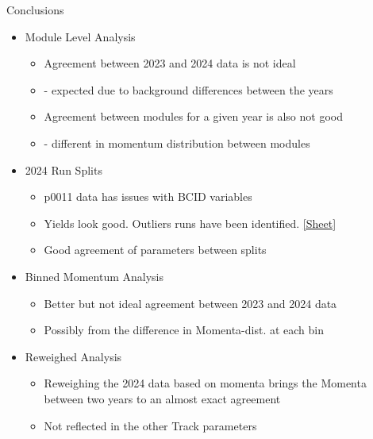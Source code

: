 \begin{frame}{Conclusions}
    \begin{itemize}
        \item Module Level Analysis
        \begin{itemize}
            \item Agreement between 2023 and 2024 data is not ideal 
            \item[] - expected due to background differences between the years
            \item Agreement between modules for a given year is also not good 
            \item[] - different in momentum distribution between modules
        \end{itemize}
        \item 2024 Run Splits
        \begin{itemize}
            \item p0011 data has issues with BCID variables
            \item Yields look good. Outliers runs have been identified. \href{https://docs.google.com/spreadsheets/d/1nnYFcmhVieSHI5XAVhPiW1K6CoGYGxv2YPchwL0sqH4/edit?usp=sharing}{[Sheet]}
            \item Good agreement of parameters between splits
        \end{itemize}
        \item Binned Momentum Analysis
        \begin{itemize}
            \item Better but not ideal agreement between 2023 and 2024 data
            \item Possibly from the difference in Momenta-dist. at each bin
        \end{itemize}
        \item Reweighed Analysis
        \begin{itemize}
            \item Reweighing the 2024 data based on momenta brings the Momenta between two years to an almost exact agreement
            \item Not reflected in the other Track parameters
        \end{itemize}
    \end{itemize}
\end{frame}